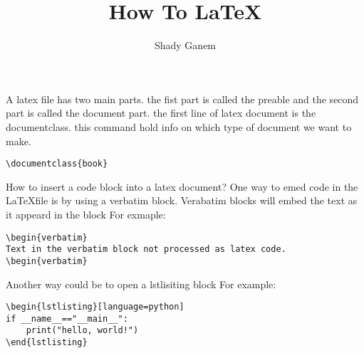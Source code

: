 \documentclass[a4paper, 12pt]{book}
\title{How To \LaTeX}
\author{Shady Ganem}
\begin{document}
\maketitle
A latex file has two main parts.
\newline the fist part is called the preable and the second part is called the document part.
\newline the first line of latex document is the documentclass. this command hold info on which type of
document we want to make.

\begin{verbatim}
\documentclass{book}
\end{verbatim}

\newpage
How to insert a code block into a latex document?
\newline One way to emed code in the \LaTeX file is by using a verbatim 
block. Verabatim blocks will embed the text as it 
appeard in the block 
For exmaple:
\begin{verbatim}
\begin{verbatim}
Text in the verbatim block not processed as latex code.
\begin{verbatim}
\end{verbatim}
Another way could be to open a lstlisiting block
For example:
\begin{verbatim}
\begin{lstlisting}[language=python]
if __name__=="__main__":
    print("hello, world!")
\end{lstlisting}
\end{verbatim}
\end{document}

